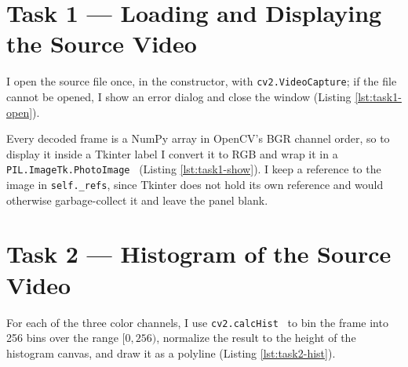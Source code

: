 \section{Task 1 --- Loading and Displaying the Source Video}
\label{sec:task1}



I open the source file once, in the constructor, with
\texttt{cv2.VideoCapture}; if the file cannot be opened, I show an
error dialog and close the window (Listing \ref{lst:task1-open}).



Every decoded frame is a NumPy array in OpenCV's BGR channel order,
so to display it inside a Tkinter label I convert it to RGB and wrap
it in a \texttt{PIL.ImageTk.PhotoImage}~\citep{pillow} (Listing
\ref{lst:task1-show}). I keep a reference to the image in
\texttt{self.\_refs}, since Tkinter does not hold its own reference
and would otherwise garbage-collect it and leave the panel blank.




\section{Task 2 --- Histogram of the Source Video}
\label{sec:task2}



For each of the three color channels, I use
\texttt{cv2.calcHist}~\citep{bradski2000} to bin the frame into 256 bins
over the range $[0,256)$, normalize the result to the height of the
histogram canvas, and draw it as a polyline (Listing
\ref{lst:task2-hist}).

